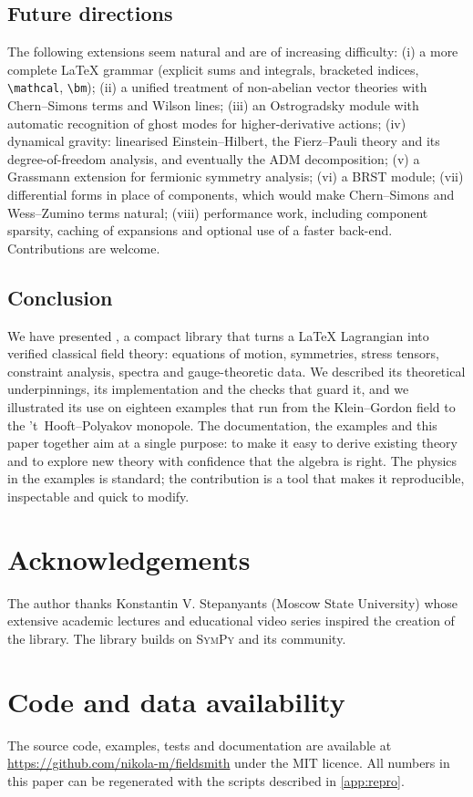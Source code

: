 \subsection{Future directions}

The following extensions seem natural and are of increasing difficulty:
(i) a more complete \LaTeX{} grammar (explicit sums and integrals, bracketed indices, \verb|\mathcal|, \verb|\bm|); (ii) a unified treatment of non-abelian vector theories with Chern--Simons terms and Wilson lines; (iii) an Ostrogradsky module with automatic recognition of ghost modes for higher-derivative actions; (iv) dynamical gravity: linearised Einstein--Hilbert, the Fierz--Pauli theory and its degree-of-freedom analysis, and eventually the ADM decomposition; (v) a Grassmann extension for fermionic symmetry analysis; (vi) a BRST module; (vii) differential forms in place of components, which would make Chern--Simons and Wess--Zumino terms natural; (viii) performance work, including component sparsity, caching of expansions and optional use of a faster back-end. Contributions are welcome.

\subsection{Conclusion}

We have presented \fs{}, a compact library that turns a \LaTeX{} Lagrangian into verified classical field theory: equations of motion, symmetries, stress tensors, constraint analysis, spectra and gauge-theoretic data. We described its theoretical underpinnings, its implementation and the checks that guard it, and we illustrated its use on eighteen examples that run from the Klein--Gordon field to the 't~Hooft--Polyakov monopole. The documentation, the examples and this paper together aim at a single purpose: to make it easy to derive existing theory and to explore new theory with confidence that the algebra is right. The physics in the examples is standard; the contribution is a tool that makes it reproducible, inspectable and quick to modify.

\section*{Acknowledgements}
The author thanks Konstantin V. Stepanyants (Moscow State University) whose extensive academic lectures and educational video series inspired the creation of the library. The library builds on \textsc{SymPy} and its community.

\section*{Code and data availability}
The source code, examples, tests and documentation are available at \url{https://github.com/nikola-m/fieldsmith} under the MIT licence. All numbers in this paper can be regenerated with the scripts described in \cref{app:repro}.

